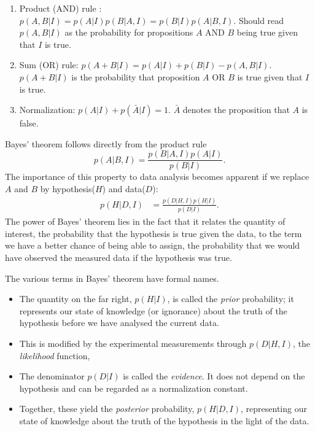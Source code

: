 \documentclass[%
oneside,                 %
final,                   %
10pt]{article}
\begin{document}
\begin{enumerate}
\item Product (AND) rule : $p(A, B | I) = p(A|I) p(B|A, I) = p(B|I)p(A|B,I)$. Should read $p(A,B|I)$ as the probability for propositions $A$ AND $B$ being true given that $I$ is true.

\item Sum (OR) rule: $p(A + B | I) = p(A | I) + p(B | I) - p(A, B | I)$. $p(A+B|I)$ is the probability that proposition $A$ OR $B$ is true given that $I$ is true.

\item Normalization: $p(A|I) + p(\bar{A}|I) = 1$. $\bar{A}$ denotes the proposition that $A$ is false.
\end{enumerate}

\noindent
Bayes' theorem follows directly from the product rule
$$
p(A|B,I) = \frac{p(B|A,I) p(A|I)}{p(B|I)}.
$$
The importance of this property to data analysis becomes apparent if we replace $A$ and $B$ by hypothesis($H$) and data($D$):
\begin{align}
p(H|D,I) &= \frac{p(D|H,I) p(H|I)}{p(D|I)}.
\label{eq:bayes}
\end{align}
The power of Bayes’ theorem lies in the fact that it relates the quantity of interest, the probability that the hypothesis is true given the data, to the term we have a better chance of being able to assign, the probability that we would have observed the measured data if the hypothesis was true.

The various terms in Bayes’ theorem have formal names. 
\begin{itemize}
\item The quantity on the far right, $p(H|I)$, is called the \emph{prior} probability; it represents our state of knowledge (or ignorance) about the truth of the hypothesis before we have analysed the current data. 

\item This is modified by the experimental measurements through $p(D|H,I)$, the \emph{likelihood} function, 

\item The denominator $p(D|I)$ is called the \emph{evidence}. It does not depend on the hypothesis and can be regarded as a normalization constant.

\item Together, these yield the \emph{posterior} probability, $p(H|D, I )$, representing our state of knowledge about the truth of the hypothesis in the light of the data. 
\end{itemize}

\noindent

\end{document}
